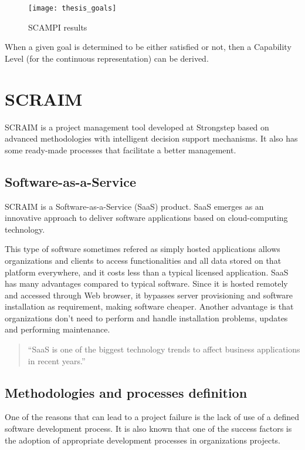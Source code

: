 \begin{figure}[h]
	\begin{center}
		\leavevmode
		\texttt{[image: thesis\_goals]}
		\caption{SCAMPI results}
		\label{fig:scampiresults}
	\end{center}
\end{figure}


When a given goal is determined to be either satisfied or not, then a Capability Level (for the continuous representation) can be derived.

\section{SCRAIM}

SCRAIM \citep{SCRAIM} is a project management tool developed at Strongstep based on advanced methodologies with intelligent decision support mechanisms. It also has some ready-made processes that facilitate a better management.

\subsection{Software-as-a-Service}

SCRAIM is a Software-as-a-Service (SaaS) product. SaaS emerges as an innovative
approach to deliver software applications based on cloud-computing
technology. \citep{Chou:2007:ANI:1359479.1359484}

This type of software sometimes refered as simply hosted applications allows organizations and clients to access functionalities and all data stored on that platform everywhere, and it costs less than a typical licensed application. SaaS has many advantages compared to typical software. Since it is hosted remotely and accessed through Web browser, it bypasses server provisioning and software
installation as requirement, making software cheaper. Another advantage is that organizations don't need to perform and handle installation problems, updates and performing maintenance.

\begin{quote}
	``SaaS is one of the biggest technology trends to affect business
	applications in recent years.''~\cite{House2009}
\end{quote}

\subsection{Methodologies and processes definition}
One of the reasons that can lead to a project failure is the lack of use of a defined software development process. It is also known that one of the success factors is the adoption of appropriate development processes in organizations projects.

